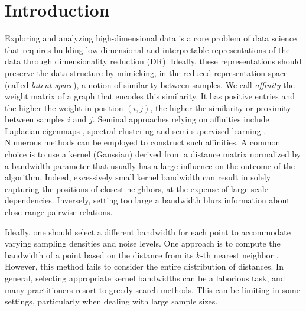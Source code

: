 
\section{Introduction}

Exploring and analyzing high-dimensional data is a core problem of data science that requires building low-dimensional and interpretable
representations of the data through dimensionality reduction (DR). Ideally, these representations should preserve the data structure by mimicking, in the reduced representation space (called \emph{latent space}), a notion of similarity between samples. 
We call \emph{affinity} the weight matrix of a graph that encodes this similarity. It has positive entries and the higher the weight in position $(i,j)$, the
higher the similarity or proximity between samples $i$ and $j$.
Seminal approaches relying on affinities include Laplacian
eigenmaps \citep{belkin2003laplacian}, spectral clustering
\citep{von2007tutorial} and semi-supervised learning \citep{zhou2003learning}. Numerous methods can be employed to construct such affinities. A common choice is to use a kernel (\eg Gaussian) derived from a distance matrix normalized by a bandwidth parameter that usually has a large influence on the outcome of the algorithm. 
Indeed, excessively small kernel bandwidth can result in %
solely capturing the positions of closest neighbors, at the expense of large-scale dependencies. Inversely, setting too large a bandwidth blurs information about close-range pairwise relations. 

Ideally, one should select a different bandwidth for each point to accommodate varying sampling densities and noise levels. One approach is to compute the bandwidth of a point based on the distance from its $k$-th nearest neighbor \cite{zelnik2004self}. However, this method fails to consider the entire distribution of distances.
In general, selecting appropriate kernel bandwidths can be a laborious task, and many practitioners resort to greedy search methods. This can be limiting in some settings, particularly when dealing with large sample sizes.


